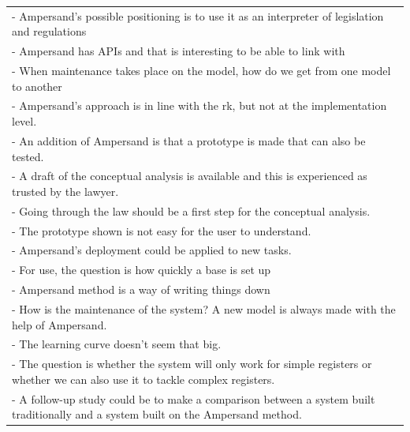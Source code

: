 \begin{xltabular}{\textwidth}{|X|}
\\-	Ampersand's possible positioning is to use it as an interpreter of legislation and regulations
\\-	Ampersand has APIs and that is interesting to be able to link with
\\-	When maintenance takes place on the model, how do we get from one model to another
\\-	Ampersand's approach is in line with the \acrlong{rk}, but not at the implementation level.
\\-	An addition of Ampersand is that a prototype is made that can also be tested. 
\\-	A draft of the conceptual analysis is available and this is experienced as trusted by the lawyer. 
\\-	Going through the law should be a first step for the conceptual analysis.
\\-	The prototype shown is not easy for the user to understand.
\\-	Ampersand's deployment could be applied to new tasks.
\\-	For use, the question is how quickly a base is set up
\\-	Ampersand method is a way of writing things down
\\-	How is the maintenance of the system? A new model is always made with the help of Ampersand.
\\-	The learning curve doesn't seem that big. 
\\-	The question is whether the system will only work for simple registers or whether we can also use it to tackle complex registers.
\\-	A follow-up study could be to make a comparison between a system built traditionally and a system built on the Ampersand method. 

\end{xltabular}

